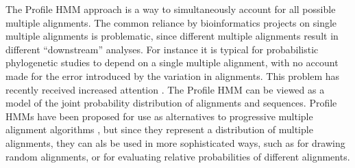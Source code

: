 \documentclass[preprint,12pt,authoryear]{elsarticle}
\begin{document}
The Profile HMM approach is a way to simultaneously account for all
possible multiple alignments.  The common reliance by bioinformatics
projects on single multiple alignments is problematic, since different
multiple alignments result in different ``downstream'' analyses.  For
instance it is typical for probabilistic phylogenetic studies to
depend on a single multiple alignment, with no account made for the
error introduced by the variation in alignments.  This problem has
recently received increased attention
\citep[e.g. see][]{Lunter:2008fj,Wong:2008wj}.  The Profile HMM can be
viewed as a model of the joint probability distribution of alignments
and sequences.  Profile HMMs have been proposed for use as alternatives to
progressive multiple alignment algorithms \citep[e.g.][]{eddy:1995}, but since they
represent a distribution of multiple alignments, they can als be used in
more sophisticated ways, such as for drawing random alignments, or for
evaluating relative probabilities of different alignments.
 

% 
\end{document}
